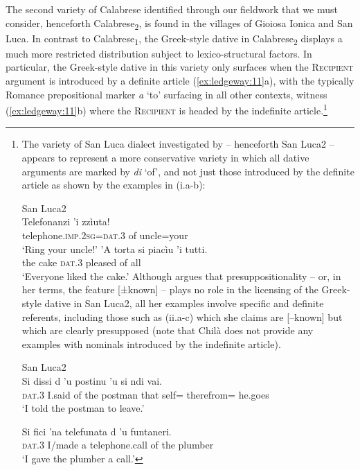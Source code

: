 \documentclass[output=paper,modfonts,nonflat,colorlinks,citecolor=brown]{langsci/langscibook}
\begin{document}
The second variety of Calabrese identified through our fieldwork that we must consider, henceforth Calabrese\textsubscript{2}, is found in the villages of Gioiosa Ionica and San Luca. In contrast to Calabrese\textsubscript{1}, the Greek-style dative in Calabrese\textsubscript{2} displays a much more restricted distribution subject to lexico-structural factors. In particular, the Greek-style dative in this variety only surfaces when the \textsc{Recipient} argument is introduced by a definite article (\ref{ex:ledgeway:11}a), with the typically Romance prepositional marker \textit{a} ‘to’ surfacing in all other contexts, witness (\ref{ex:ledgeway:11}b) where the \textsc{Recipient} is headed by the indefinite article.\footnote{The
    variety of San Luca dialect investigated by \citet{Chilà2017} – henceforth San Luca2 – appears to represent a more conservative variety in which all dative arguments are marked by \textit{di} ‘of’, and not just those introduced by the definite article as shown by the examples in (i.a-b):
    
    \ea
    San Luca2 \\
    \ea
    \gll Telefonanzi  ’i  zzìuta!   \\
        telephone.\textsc{imp.2sg=dat.3}  of  uncle=your  \\
        \glt `Ring your uncle!' 
    \ex  ’A  torta  si  piacìu  ’i  tutti.\\
        the  cake  \textsc{dat}.3  pleased  of  all  \\
        \glt `Everyone liked the cake.'
        \z
        \z        
        Although \citet[4-5]{Chilà2017} argues that presuppositionality – or, in her terms, the feature [±known] – plays no role in the licensing of the Greek-style dative in San Luca2, all her examples involve specific and definite referents, including those such as (ii.a-c) which she claims are [–known] but which are clearly presupposed (note that Chilà does not provide any examples with nominals introduced by the indefinite article).  
    
    \ea
    San Luca2 \\
    \ea 
    \gll Si  dissi  d  ’u  postinu  ’u  si  ndi  vai.\\
    \textsc{dat}.3  I.said  of  the  postman  that  self=  therefrom=  he.goes\\
    \glt `I told the postman to leave.'  
    
    \ex
    \gll Si  fici  ’na  telefunata  d  ’u  funtaneri.\\
    \textsc{dat}.3  I/made  a  telephone.call  of  the  plumber \\
    \glt `I gave the plumber a call.' 
    
}
\end{document}
